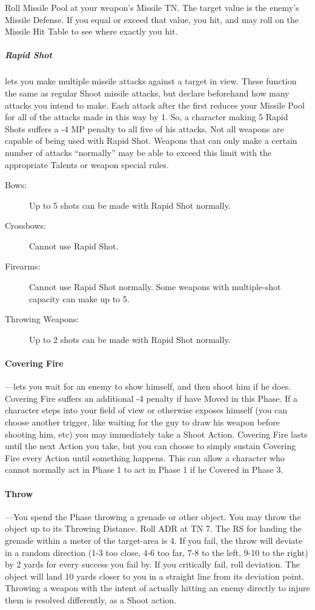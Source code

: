 \documentclass[oneside,11pt,english]{book}
\begin{document}
Roll Missile Pool at your weapon’s Missile TN. The target value is the enemy’s
Missile Defense. If you equal or exceed that value, you hit, and may roll on the
Missile Hit Table to see where exactly you hit. 
\subparagraph{Rapid Shot} lets you make multiple missile attacks against a
target in view. These function the same as regular Shoot missile attacks, but
declare beforehand how many attacks you intend to make. Each attack after the
first reduces your Missile Pool for all of the attacks made in this way by 1.
So, a character making 5 Rapid Shots suffers a -4 MP penalty to all five of his
attacks. Not all weapons are capable of being used with Rapid Shot. Weapons that
can only make a certain number of attacks “normally” may be able to exceed this
limit with the appropriate Talents or weapon special rules. 
\begin{description}
\item [Bows:] Up to 5 shots can be made with Rapid Shot normally.
\item	[Crossbows:] Cannot use Rapid Shot.
\item	[Firearms:] Cannot use Rapid Shot normally. Some weapons with
  multiple-shot capacity can make up to 5. 
\item 	[Throwing Weapons:] Up to 2 shots can be made with Rapid Shot normally.
\end{description}

\paragraph{\label{par:Covering Fire} Covering Fire}---\quad lets you wait for an enemy to show himself, and then shoot him if he does.
Covering Fire suffers an additional -4 penalty if have Moved in this Phase. If a character steps
into your field of view or otherwise exposes himself (you can choose another trigger, like waiting
for the guy to draw his weapon before shooting him, etc) you may immediately take a Shoot
Action. Covering Fire lasts until the next Action you take, but you can choose to simply sustain
Covering Fire every Action until something happens. This can allow a character who cannot
normally act in Phase 1 to act in Phase 1 if he Covered in Phase 3.

\paragraph{Throw}---\quad You spend the Phase throwing a grenade or other
object. You may throw the object up to its Throwing Distance. Roll ADR at TN 7.
The RS for landing the grenade within a meter of the target-area is 4. If you
fail, the throw will deviate in a random direction (1-3 too close, 4-6 too far,
7-8 to the left, 9-10 to the right) by 2 yards for every success you fail by. If
you critically fail, roll deviation. The object will land 10 yards closer to you
in a straight line from its deviation point. Throwing a weapon with the intent
of actually hitting an enemy directly to injure them is resolved differently, as
a Shoot action. 
\end{document}
